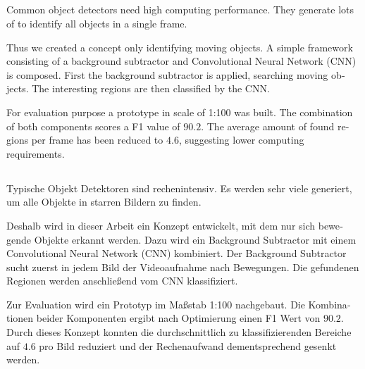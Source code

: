 \vspace*{\fill}
\begingroup
\let\clearpage\relax
\let\cleardoublepage\relax
\let\cleardoublepage\relax

\begin{otherlanguage}{american}
	\chapter*{}
	Common object detectors need high computing performance.
	They generate lots of  to identify all objects in a single frame.

	Thus we created a concept only identifying moving objects.
	A simple framework consisting of a background subtractor and Convolutional Neural Network (CNN) is composed.
	First the background subtractor is applied, searching moving objects.
	The interesting regions are then classified by the CNN.

	For evaluation purpose a prototype in scale of 1:100 was built.
	The combination of both components scores a F1 value of $90.2$.
	The average amount of found regions per frame has been reduced to $4.6$, suggesting lower computing requirements.
\end{otherlanguage}


\vspace{2cm}
\begin{otherlanguage}{ngerman}
	\chapter*{}
	Typische Objekt Detektoren sind rechenintensiv.
	Es werden sehr viele  generiert, um alle Objekte in starren Bildern zu finden.

	Deshalb wird in dieser Arbeit ein Konzept entwickelt, mit dem nur sich bewegende Objekte erkannt werden.
	Dazu wird ein Background Subtractor mit einem Convolutional Neural Network (CNN) kombiniert.
	Der Background Subtractor sucht zuerst in jedem Bild der Videoaufnahme nach Bewegungen.
	Die gefundenen Regionen werden anschließend vom CNN klassifiziert.

	Zur Evaluation wird ein Prototyp im Maßstab 1:100 nachgebaut.
	Die Kombinationen beider Komponenten ergibt nach Optimierung einen F1 Wert von $90.2$.
	Durch dieses Konzept konnten die durchschnittlich zu klassifizierenden Bereiche auf $4.6$ pro Bild reduziert und der Rechenaufwand dementsprechend gesenkt werden.
\end{otherlanguage}

\endgroup

\vspace*{\fill}